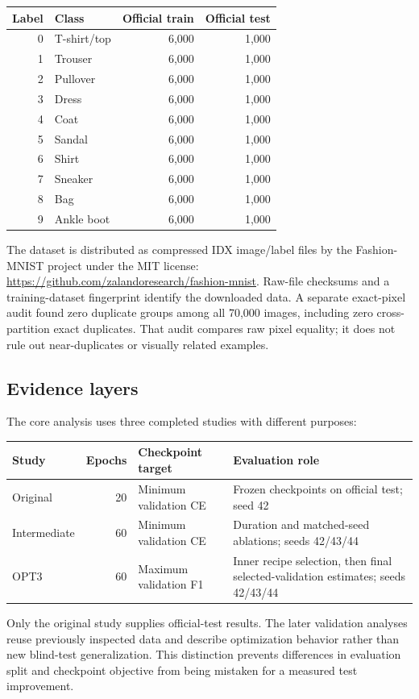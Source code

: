 \begin{center}
\small
\begin{tabular}{rlrr}
\toprule
Label & Class & Official train & Official test \\
\midrule
0 & T-shirt/top & 6,000 & 1,000 \\
1 & Trouser & 6,000 & 1,000 \\
2 & Pullover & 6,000 & 1,000 \\
3 & Dress & 6,000 & 1,000 \\
4 & Coat & 6,000 & 1,000 \\
5 & Sandal & 6,000 & 1,000 \\
6 & Shirt & 6,000 & 1,000 \\
7 & Sneaker & 6,000 & 1,000 \\
8 & Bag & 6,000 & 1,000 \\
9 & Ankle boot & 6,000 & 1,000 \\
\bottomrule
\end{tabular}
\end{center}
The dataset is distributed as compressed IDX image/label files by the Fashion-MNIST project under the MIT license: \url{https://github.com/zalandoresearch/fashion-mnist}. Raw-file checksums and a training-dataset fingerprint identify the downloaded data. A separate exact-pixel audit found zero duplicate groups among all 70,000 images, including zero cross-partition exact duplicates. That audit compares raw pixel equality; it does not rule out near-duplicates or visually related examples.\par

\subsection{Evidence layers}
The core analysis uses three completed studies with different purposes:
\begin{center}\small
\begin{tabularx}{\linewidth}{lrlX}\toprule
Study & Epochs & Checkpoint target & Evaluation role\\\midrule
Original & 20 & Minimum validation CE & Frozen checkpoints on official test; seed 42\\
Intermediate & 60 & Minimum validation CE & Duration and matched-seed ablations; seeds 42/43/44\\
OPT3 & 60 & Maximum validation F1 & Inner recipe selection, then final selected-validation estimates; seeds 42/43/44\\
\bottomrule\end{tabularx}\end{center}
Only the original study supplies official-test results. The later validation analyses reuse previously inspected data and describe optimization behavior rather than new blind-test generalization. This distinction prevents differences in evaluation split and checkpoint objective from being mistaken for a measured test improvement.

